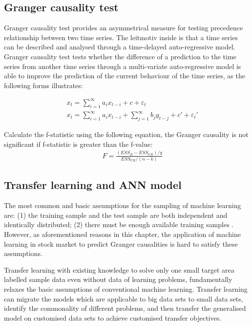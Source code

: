\subsection{Granger causality test}
Granger causality test \cite{granger1969investigating} provides an asymmetrical measure for testing precedence relationship between two time series. The leitmotiv inside is that a time series can be described and analysed through a time-delayed auto-regressive model. Granger causality test tests whether the difference of a prediction to the time series from another time series through a multi-variate auto-regressive model is able to improve the prediction of the current behaviour of the time series, as the following forms illustrates:

\begin{eqnarray}
&&	x_t=\sum_{i=1}^{\infty}a_ix_{t-i}+c+\varepsilon_{t}\\
&&x_t=\sum_{i=1}^{\infty}a_ix_{t-i}+\sum_{j=1}^{\infty}b_jy_{t-j}+c'+\varepsilon_{t}'
\end{eqnarray}

Calculate the f-statistic using the following equation, the Granger causality is not significant if f-statistic is greater than the f-value:
\begin{eqnarray}
&&	F=\frac{(ESS_R-ESS_{UR})/q}{ESS_{UR}/(n-k)}
\end{eqnarray}

\subsection{Transfer learning and ANN model}
\label{sbs:transfer}
The most common and basic assumptions for the sampling of machine learning are: (1) the training sample and the test sample are both independent and identically distributed; (2) there must be enough available training samples \cite{rasmussen2004gaussian}. However, as aforementioned reasons in this chapter, the application of machine learning in stock market to predict Granger causalities is hard to satisfy these assumptions.

Transfer learning with existing knowledge to solve only one small target area labelled sample data even without data of learning problems, fundamentally relaxes the basic assumptions of conventional machine learning. Transfer learning can migrate the models which are applicable to big data sets to small data sets, identify the commonality of different problems, and then transfer the generalised model on customised data sets to achieve customised transfer objectives.


